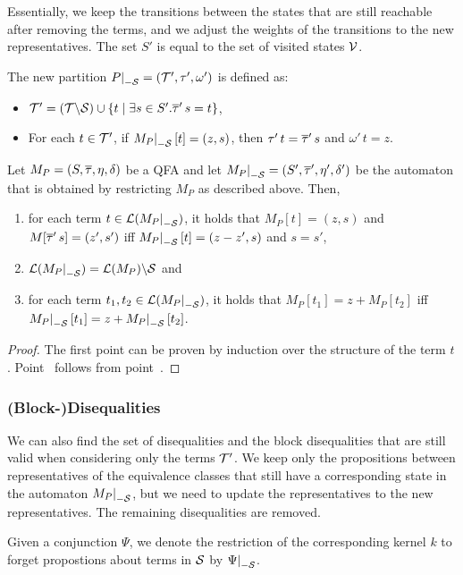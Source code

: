 Essentially, we keep the transitions between the states that are still reachable after removing the terms, and we adjust the weights of the transitions to the new representatives.
The set $S'$ is equal to the set of visited states $\mathcal{V}$.

The new partition $\restr{P}{-\Set} = (\T', \tau', \omega')$ is defined as:
\begin{itemize}
    \item $\mathcal{T}' = (\mathcal{T} \backslash \mathcal{S}) \cup \{t \mid \exists s \in S' . \overline{\tau}'\,s = t\}$,
    \item For each $t \in \mathcal{T}'$, if $\restr{M_P}{-\Set}[t] = (z, s)$, then $\tau'\,t = \overline{\tau}'\,s$ and $\omega'\,t = z$.
\end{itemize}

\begin{theorem}\label{restriction}
    Let $M_P = (S, \overline{\tau}, \eta, \delta)$ be a QFA and let $\restr{M_P}{-\Set} = (S', \otau', \eta', \delta')$ be the automaton that is obtained by restricting $M_P$ as described above.
    Then,
    \begin{enumerate}
        \item\label{item:lemma-restriction} for each term $t \in \L(\restr{M_P}{-\Set})$, it holds that $M_P[t] = (z, s)$ and $M[\overline{\tau}'\,s] = (z', s')$ iff $\restr{M_P}{-\Set}[t] = (z - z', s)$ and $s = s'$,
        \item $\L(\restr{M_P}{-\Set}) = \L(M_P) \backslash \Set$ and
              \item\label{item:correctness-restriction} for each term $t_1, t_2 \in \L(\restr{M_P}{-\Set})$, it holds that $M_P[t_1] = z + M_P[t_2]$ iff $\restr{M_P}{-\Set}[t_1] = z + \restr{M_P}{-\Set}[t_2]$.
    \end{enumerate}
\end{theorem}
\begin{proof}
    The first point can be proven by induction over the structure of the term $t$.
    Point~ follows from point~.
\end{proof}
\subsubsection{(Block-)Disequalities}
We can also find the set of disequalities and the block disequalities that are still valid when considering only the terms $\mathcal{T}'$.
We keep only the propositions between representatives of the equivalence classes that
still have a corresponding state in the automaton $\restr{M_P}{-\Set}$, but we need to update the representatives to the new representatives.
The remaining disequalities are removed.

Given a conjunction $\Psi$, we denote the restriction of the corresponding kernel $k$ to forget propostions about terms in $\mathcal{S}$ by $\restr{\Psi}{-\Set}$.
